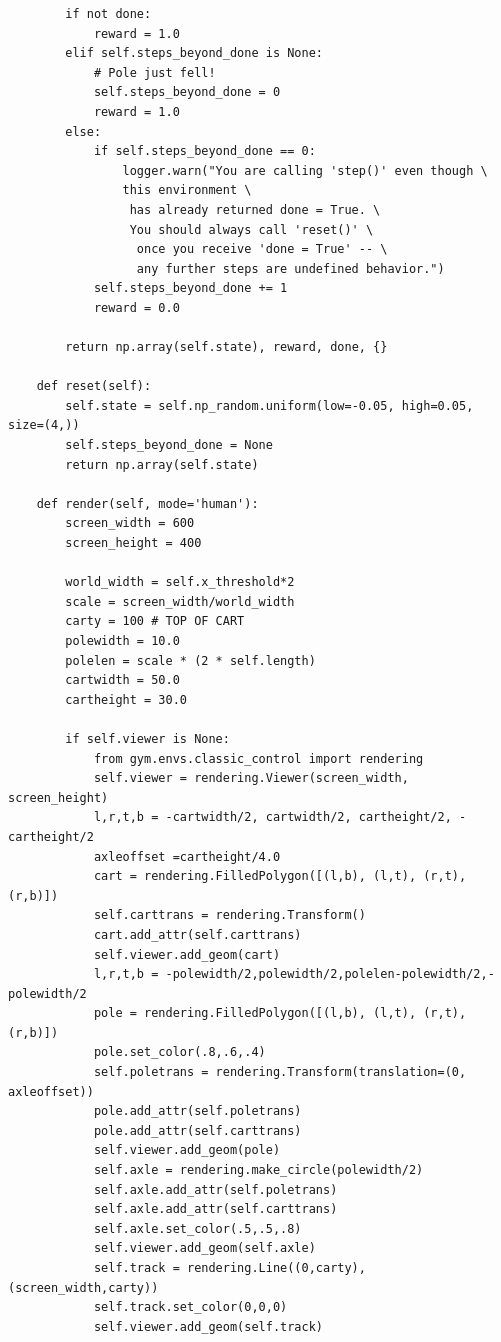 \documentclass[cic,tc]{iiufrgs}
\newenvironment{longlisting}{\captionsetup{type=listing}}{}
\begin{document}
\begin{longlisting}
\begin{verbatim}
        if not done:
            reward = 1.0
        elif self.steps_beyond_done is None:
            # Pole just fell!
            self.steps_beyond_done = 0
            reward = 1.0
        else:
            if self.steps_beyond_done == 0:
                logger.warn("You are calling 'step()' even though \
                this environment \
                 has already returned done = True. \
                 You should always call 'reset()' \
                  once you receive 'done = True' -- \
                  any further steps are undefined behavior.")
            self.steps_beyond_done += 1
            reward = 0.0

        return np.array(self.state), reward, done, {}

    def reset(self):
        self.state = self.np_random.uniform(low=-0.05, high=0.05, size=(4,))
        self.steps_beyond_done = None
        return np.array(self.state)

    def render(self, mode='human'):
        screen_width = 600
        screen_height = 400

        world_width = self.x_threshold*2
        scale = screen_width/world_width
        carty = 100 # TOP OF CART
        polewidth = 10.0
        polelen = scale * (2 * self.length)
        cartwidth = 50.0
        cartheight = 30.0

        if self.viewer is None:
            from gym.envs.classic_control import rendering
            self.viewer = rendering.Viewer(screen_width, screen_height)
            l,r,t,b = -cartwidth/2, cartwidth/2, cartheight/2, -cartheight/2
            axleoffset =cartheight/4.0
            cart = rendering.FilledPolygon([(l,b), (l,t), (r,t), (r,b)])
            self.carttrans = rendering.Transform()
            cart.add_attr(self.carttrans)
            self.viewer.add_geom(cart)
            l,r,t,b = -polewidth/2,polewidth/2,polelen-polewidth/2,-polewidth/2
            pole = rendering.FilledPolygon([(l,b), (l,t), (r,t), (r,b)])
            pole.set_color(.8,.6,.4)
            self.poletrans = rendering.Transform(translation=(0, axleoffset))
            pole.add_attr(self.poletrans)
            pole.add_attr(self.carttrans)
            self.viewer.add_geom(pole)
            self.axle = rendering.make_circle(polewidth/2)
            self.axle.add_attr(self.poletrans)
            self.axle.add_attr(self.carttrans)
            self.axle.set_color(.5,.5,.8)
            self.viewer.add_geom(self.axle)
            self.track = rendering.Line((0,carty), (screen_width,carty))
            self.track.set_color(0,0,0)
            self.viewer.add_geom(self.track)


\end{verbatim}
\end{longlisting}
\end{document}
